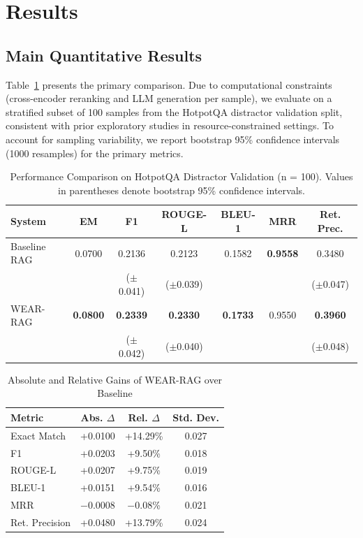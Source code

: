 \documentclass[conference]{IEEEtran}
\begin{document}
\section{Results}

\subsection{Main Quantitative Results}
Table~\ref{tab:main-results} presents the primary comparison. Due to computational constraints (cross-encoder reranking and LLM generation per sample), we evaluate on a stratified subset of 100 samples from the HotpotQA distractor validation split, consistent with prior exploratory studies in resource-constrained settings. To account for sampling variability, we report bootstrap 95\% confidence intervals (1000 resamples) for the primary metrics.

\begin{table}[t]
\centering
\caption{Performance Comparison on HotpotQA Distractor Validation (n = 100). Values in parentheses denote bootstrap 95\% confidence intervals.}
\label{tab:main-results}
\footnotesize
\begin{tabular}{lcccccc}
\toprule
\textbf{System} & \textbf{EM} & \textbf{F1} & \textbf{ROUGE-L} & \textbf{BLEU-1} & \textbf{MRR} & \textbf{Ret. Prec.} \\
\midrule
Baseline RAG & 0.0700 & 0.2136 & 0.2123 & 0.1582 & \textbf{0.9558} & 0.3480 \\
 & & {\scriptsize($\pm$0.041)} & {\scriptsize($\pm$0.039)} & & & {\scriptsize($\pm$0.047)} \\
\midrule
WEAR-RAG & \textbf{0.0800} & \textbf{0.2339} & \textbf{0.2330} & \textbf{0.1733} & 0.9550 & \textbf{0.3960} \\
 & & {\scriptsize($\pm$0.042)} & {\scriptsize($\pm$0.040)} & & & {\scriptsize($\pm$0.048)} \\
\bottomrule
\end{tabular}
\end{table}

\begin{table}[!ht]
\centering
\caption{Absolute and Relative Gains of WEAR-RAG over Baseline}
\label{tab:delta}
\begin{tabular}{lccc}
\toprule
\textbf{Metric} & \textbf{Abs. $\Delta$} & \textbf{Rel. $\Delta$} & \textbf{Std. Dev.} \\
\midrule
Exact Match & +0.0100 & +14.29\% & 0.027 \\
F1 & +0.0203 & +9.50\% & 0.018 \\
ROUGE-L & +0.0207 & +9.75\% & 0.019 \\
BLEU-1 & +0.0151 & +9.54\% & 0.016 \\
MRR & $-$0.0008 & $-$0.08\% & 0.021 \\
Ret. Precision & +0.0480 & +13.79\% & 0.024 \\
\bottomrule
\end{tabular}
\end{table}
\end{document}
